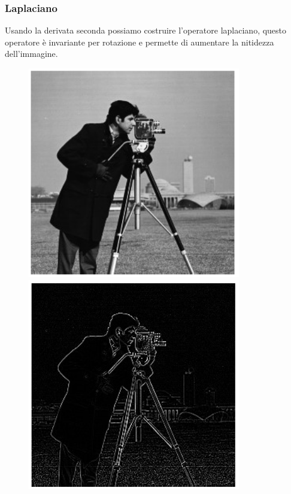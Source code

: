 \subsubsection{Laplaciano}
Usando la derivata seconda possiamo costruire l'operatore laplaciano, questo operatore è invariante per rotazione e permette di aumentare la nitidezza dell'immagine.
\begin{figure}
	\vspace{-.4cm}
	\centering
	\includegraphics[width=.9\linewidth]{Picture/Cameraman_Original}
	\includegraphics[width=.9\linewidth]{Picture/Cameraman_Laplacian}
\end{figure}
